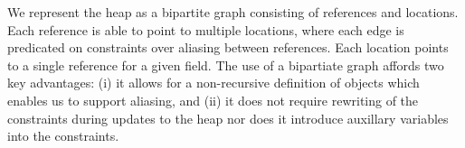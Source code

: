 \begin{comment}


The solution presented in this paper to enabling value sets in
symbolic execution with lazy initialization is to represent the heap
as a bipartite graph consisting of references and locations. A
reference is able to point to several different locations: each edge
predicated on constraints over aliasing between references. Locations
point back to references on different fields. The bipartite graph
enables (i) the use of aliasing to define objects rather than
recursive definitions; (ii) value set computation using only local
information; and (iii) heap updates that only impact affected
locations, require no constraint rewriting, and require no auxiliary
variables in the constraints.  We call this new heap a summary heap.

To mitigate state space explosion in GSE, the solution described in
paper uses a summary heap in the symbolic execution. This summary heap
algorithm defines how the bipartite graph updates in lazy
initialization. Unlike GSE, however, the summary heap algorithm
partitions only at points of divergence in the control flow
graph. These points of non-determinism are at field accesses or writes
that lead to null-pointer exceptions and at comparisons of
references. The former represents a divergence due to exceptional
control flow while the later due to program structure.


\end{comment}
We represent the heap as a bipartite graph consisting of references and locations. Each reference is able to point to multiple locations, where each edge is predicated on constraints over aliasing between references. Each location points to a single reference for a given field. The use of a bipartiate graph affords two
key advantages: (i) it allows for a non-recursive definition of objects which enables us to support aliasing, and (ii) it does not require rewriting of the constraints during updates to the heap nor does it introduce auxillary variables into the constraints.

